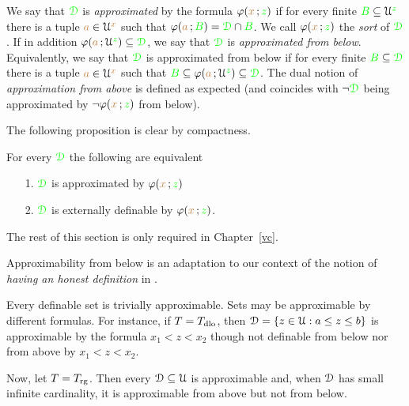 \begin{definition}\label{def_approx}
We say that ${\color{green}\EuScript D}$ is \emph{approximated\/} by the formula $\varphi({\color{brown} x}\,;{\color{green} z})$ if for every finite ${\color{green} B}\subseteq\EuScript U^{\color{green} z}$ there is a tuple ${\color{brown} a}\in\EuScript U^{\color{brown} x}$ such that $\varphi({\color{brown} a}\,;{\color{green} B})={\color{green}\EuScript D}\cap{\color{green}B}$.
We call $\varphi({\color{brown} x}\,;{\color{green} z})$ the \emph{sort} of ${\color{green}\EuScript D}$.
If in addition $\varphi({\color{brown} a}\,;\EuScript U^{\color{green} z})\subseteq{\color{green}\EuScript D}$, we say that  ${\color{green}\EuScript D}$ is \emph{approximated from below}.
Equivalently, we say that  ${\color{green}\EuScript D}$ is approximated from below if for every finite ${\color{green} B}\subseteq{\color{green}\EuScript D}$ there is a tuple ${\color{brown} a}\in\EuScript U^{\color{brown} x}$ such that  ${\color{green} B}\subseteq\varphi({\color{brown} a}\,;\EuScript U^{\color{green} z})\subseteq{\color{green}\EuScript D}$.
The dual notion of \emph{approximation from above\/} is defined as expected (and coincides with $\neg{\color{green}\EuScript D}$ being approximated by $\neg\varphi({\color{brown} x}\,;{\color{green} z})$ from below).
\end{definition}

The following proposition is clear by compactness.

\begin{proposition}\label{prop_approx=external}
   For every ${\color{green}\EuScript D}$ the following are equivalent
   \begin{itemize}
   \item[1.] ${\color{green}\EuScript D}$ is approximated by $\varphi({\color{brown} x}\,;{\color{green} z})$
   \item[2.] ${\color{green}\EuScript D}$ is externally definable by $\varphi({\color{brown} x}\,;{\color{green} z})$.
   \end{itemize}
\end{proposition}

The rest of this section is only required in Chapter~\ref{vc}.

Approximability from below is an adaptation to our context of the notion of \textit{having an honest definition} in \cite{CS}.

\begin{example}
Every definable set is trivially approximable.
Sets may be approximable by different formulas.
For instance, if $T=T_{\rm dlo}$, then $\EuScript D=\{z\in\EuScript U:a\le z\le b\}$ is approximable by the formula $x_1<z<x_2$ though not definable from below nor from above by $x_1<z<x_2$.

Now, let $T=T_{\rm rg}$.
Then every $\EuScript D\subseteq\EuScript U$ is approximable and, when $\EuScript D$ has small infinite cardinality, it is approximable from above but not from below.
\end{example}

